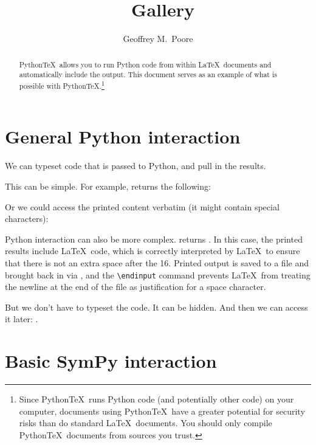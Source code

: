\documentclass[11pt]{article}
\title{\pytex\ Gallery}
\author{Geoffrey M.\ Poore}
\newcommand{\pytex}{Python\TeX}
\begin{document}
\maketitle


\begin{abstract}
\pytex\ allows you to run Python code from within \LaTeX\ documents and automatically include the output.  This document serves as an example of what is possible with \pytex.\footnote{Since \pytex\ runs Python code (and potentially other code) on your computer, documents using \pytex\ have a greater potential for security risks than do standard \LaTeX\ documents.  You should only compile \pytex\ documents from sources you trust.}
\end{abstract}



\section{General Python interaction}

We can typeset code that is passed to Python, and pull in the results.

This can be simple.  For example,  returns the following:
\begin{quote}
\printpythontex
\end{quote}

Or we could access the printed content verbatim (it might contain special characters):
\begin{quote}
\printpythontex[verb]
\end{quote}

Python interaction can also be more complex.   returns \printpythontex.  In this case, the printed results include \LaTeX\ code, which is correctly interpreted by \LaTeX\ to ensure that there is not an extra space after the 16.  Printed output is saved to a file and brought back in via \verb||, and the \verb|\endinput| command prevents \LaTeX\ from treating the newline at the end of the file as justification for a space character.

But we don't have to typeset the code.  It can be hidden.  And then we can access it later:  .


\section{Basic SymPy interaction}
\end{document}
